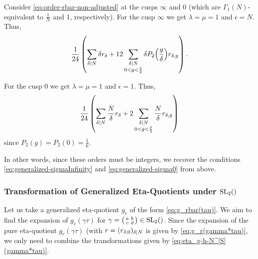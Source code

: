 \documentclass{article}
\begin{document}
Consider \eqref{eq:order-rbar-non-adjusted} at the cusps $\infty$ and
$0$ (which are $\Gamma_1(N)$-equivalent to $\frac{1}{N}$ and $1$,
respectively).
%
For the cusp $\infty$ we get $\lambda=\mu=1$ and $\epsilon=N$. Thus,
\begin{gather}
  \frac{1}{24}
  \left(
    \sum_{\delta \mid N} \delta r_\delta
    +
    12 \sum_{\substack{\delta \mid N\\0 < g < \frac{\delta}{2}}}
    \delta
    P_2\Bigl(\frac{g}{\delta}\Bigr)r_{\delta,g}
  \right).
  \label{eq:modularGamma1-sigmaInfinity}
\end{gather}

For the cusp $0$ we get $\lambda=\mu=1$ and $\epsilon=1$. Thus,
%
\begin{gather}
  \frac{1}{24}
  \left(
    \sum_{\delta \mid N} \frac{N}{\delta} r_\delta
    +
    2 \sum_{\substack{\delta \mid N\\0 < g < \frac{\delta}{2}}}
    \frac{N}{\delta} r_{\delta,g}
  \right)
  \label{eq:modularGamma1-sigma0}
\end{gather}
since $P_2(g)=P_2(0)=\frac{1}{6}$.


In other words, since these orders must be integers, we recover the
conditions \ref{eq:generalized-sigmaInfinity} and
\ref{eq:generalized-sigma0} from above.







\subsubsection{Transformation of Generalized Eta-Quotients under $\SL2Z$}

Let us take a generalized eta-quotient $g_{\bar{r}}$ of the form
\eqref{eq:g_rbar(tau)}. We aim to find the expansion of
$g_{\bar{r}}(\gamma\tau)$ for
$\gamma = \left(\begin{smallmatrix}a&b\\c&d\end{smallmatrix}\right)
\in \SL2Z$. Since the expansion of the pure eta-quotient
$g_r(\gamma\tau)$ (with $r=(r_{\delta,0})_{\delta \mid N}$ is
given by \eqref{eq:g_r(gamma*tau)}, we only need to combine the
transformations given by \eqref{eq:eta_g-h-N^[S](gamma*tau)}.
\end{document}
